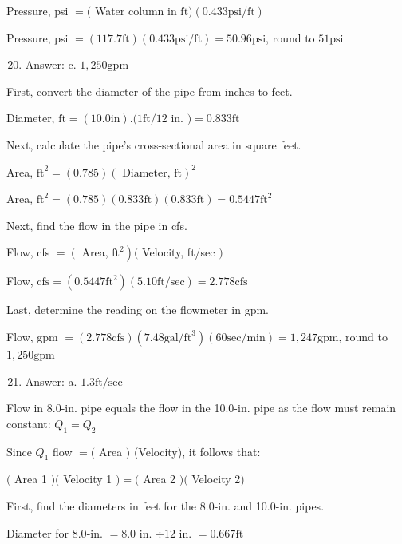 \documentclass[10pt]{article}
\begin{document}
Pressure, psi $=($ Water column in $\mathrm{ft})(0.433 \mathrm{psi} / \mathrm{ft})$

Pressure, psi $=(117.7 \mathrm{ft})(0.433 \mathrm{psi} / \mathrm{ft})=50.96 \mathrm{psi}$, round to $51 \mathrm{psi}$

\begin{enumerate}
  \setcounter{enumi}{19}
  \item Answer: c. $1,250 \mathrm{gpm}$
\end{enumerate}

First, convert the diameter of the pipe from inches to feet.

Diameter, $\mathrm{ft}=(10.0 \mathrm{in}).(1 \mathrm{ft} / 12$ in. $)=0.833 \mathrm{ft}$

Next, calculate the pipe's cross-sectional area in square feet.

Area, $\mathrm{ft}^{2}=(0.785)(\text { Diameter, } \mathrm{ft})^{2}$

Area, $\mathrm{ft}^{2}=(0.785)(0.833 \mathrm{ft})(0.833 \mathrm{ft})=0.5447 \mathrm{ft}^{2}$

Next, find the flow in the pipe in cfs.

Flow, cfs $=\left(\right.$ Area, $\left.\mathrm{ft}^{2}\right)($ Velocity, ft/sec $)$

Flow, $\mathrm{cfs}=\left(0.5447 \mathrm{ft}^{2}\right)(5.10 \mathrm{ft} / \mathrm{sec})=2.778 \mathrm{cfs}$

Last, determine the reading on the flowmeter in gpm.

Flow, gpm $=(2.778 \mathrm{cfs})\left(7.48 \mathrm{gal} / \mathrm{ft}^{3}\right)(60 \mathrm{sec} / \mathrm{min})=1,247 \mathrm{gpm}$, round to $1,250 \mathrm{gpm}$

\begin{enumerate}
  \setcounter{enumi}{20}
  \item Answer: a. $1.3 \mathrm{ft} / \mathrm{sec}$
\end{enumerate}

Flow in 8.0-in. pipe equals the flow in the 10.0-in. pipe as the flow must remain constant: $Q_{1}=Q_{2}$

Since $Q_{1}$ flow $=($ Area $)$ (Velocity), it follows that:

$($ Area 1 $)($ Velocity 1 $)=($ Area 2 $)($ Velocity 2)

First, find the diameters in feet for the 8.0-in. and 10.0-in. pipes.

Diameter for $8.0$-in. $=8.0$ in. $\div 12$ in. $=0.667 \mathrm{ft}$
\end{document}
